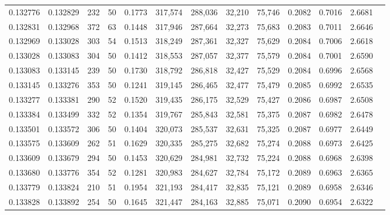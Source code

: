 \begin{tabular}{rrrrrrrrrrrrr}
0.132776 & 0.132829 &   232 &  50 &                                     0.1773 & 317,574 & 288,036 &  32,210 &  75,746 & 0.2082 & 0.7016 & 2.6681 \\
0.132831 & 0.132968 &   372 &  63 &                                     0.1448 & 317,946 & 287,664 &  32,273 &  75,683 & 0.2083 & 0.7011 & 2.6646 \\
0.132969 & 0.133028 &   303 &  54 &                                     0.1513 & 318,249 & 287,361 &  32,327 &  75,629 & 0.2084 & 0.7006 & 2.6618 \\
0.133028 & 0.133083 &   304 &  50 &                                     0.1412 & 318,553 & 287,057 &  32,377 &  75,579 & 0.2084 & 0.7001 & 2.6590 \\
0.133083 & 0.133145 &   239 &  50 &                                     0.1730 & 318,792 & 286,818 &  32,427 &  75,529 & 0.2084 & 0.6996 & 2.6568 \\
0.133145 & 0.133276 &   353 &  50 &                                     0.1241 & 319,145 & 286,465 &  32,477 &  75,479 & 0.2085 & 0.6992 & 2.6535 \\
0.133277 & 0.133381 &   290 &  52 &                                     0.1520 & 319,435 & 286,175 &  32,529 &  75,427 & 0.2086 & 0.6987 & 2.6508 \\
0.133384 & 0.133499 &   332 &  52 &                                     0.1354 & 319,767 & 285,843 &  32,581 &  75,375 & 0.2087 & 0.6982 & 2.6478 \\
0.133501 & 0.133572 &   306 &  50 &                                     0.1404 & 320,073 & 285,537 &  32,631 &  75,325 & 0.2087 & 0.6977 & 2.6449 \\
0.133575 & 0.133609 &   262 &  51 &                                     0.1629 & 320,335 & 285,275 &  32,682 &  75,274 & 0.2088 & 0.6973 & 2.6425 \\
0.133609 & 0.133679 &   294 &  50 &                                     0.1453 & 320,629 & 284,981 &  32,732 &  75,224 & 0.2088 & 0.6968 & 2.6398 \\
0.133680 & 0.133776 &   354 &  52 &                                     0.1281 & 320,983 & 284,627 &  32,784 &  75,172 & 0.2089 & 0.6963 & 2.6365 \\
0.133779 & 0.133824 &   210 &  51 &                                     0.1954 & 321,193 & 284,417 &  32,835 &  75,121 & 0.2089 & 0.6958 & 2.6346 \\
0.133828 & 0.133892 &   254 &  50 &                                     0.1645 & 321,447 & 284,163 &  32,885 &  75,071 & 0.2090 & 0.6954 & 2.6322 \\

\end{tabular}
